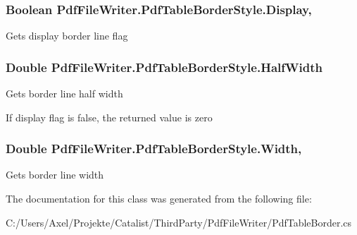 \subsubsection[{\texorpdfstring{Display}{Display}}]{\setlength{\rightskip}{0pt plus 5cm}Boolean Pdf\+File\+Writer.\+Pdf\+Table\+Border\+Style.\+Display\hspace{0.3cm}{\ttfamily [get]}, {\ttfamily [set]}}\hypertarget{class_pdf_file_writer_1_1_pdf_table_border_style_a4ecbd8db28f20ef1a991aaba3742d38c}{}\label{class_pdf_file_writer_1_1_pdf_table_border_style_a4ecbd8db28f20ef1a991aaba3742d38c}


Gets display border line flag 

\subsubsection[{\texorpdfstring{Half\+Width}{HalfWidth}}]{\setlength{\rightskip}{0pt plus 5cm}Double Pdf\+File\+Writer.\+Pdf\+Table\+Border\+Style.\+Half\+Width\hspace{0.3cm}{\ttfamily [get]}}\hypertarget{class_pdf_file_writer_1_1_pdf_table_border_style_ac40033f1aef82163dbd2be65ae2afc2c}{}\label{class_pdf_file_writer_1_1_pdf_table_border_style_ac40033f1aef82163dbd2be65ae2afc2c}


Gets border line half width 

If display flag is false, the returned value is zero 
\subsubsection[{\texorpdfstring{Width}{Width}}]{\setlength{\rightskip}{0pt plus 5cm}Double Pdf\+File\+Writer.\+Pdf\+Table\+Border\+Style.\+Width\hspace{0.3cm}{\ttfamily [get]}, {\ttfamily [set]}}\hypertarget{class_pdf_file_writer_1_1_pdf_table_border_style_af23b07561b8fc98b8e654f29c2bc2161}{}\label{class_pdf_file_writer_1_1_pdf_table_border_style_af23b07561b8fc98b8e654f29c2bc2161}


Gets border line width 



The documentation for this class was generated from the following file\+:\begin{DoxyCompactItemize}
\item 
C\+:/\+Users/\+Axel/\+Projekte/\+Catalist/\+Third\+Party/\+Pdf\+File\+Writer/Pdf\+Table\+Border.\+cs\end{DoxyCompactItemize}
